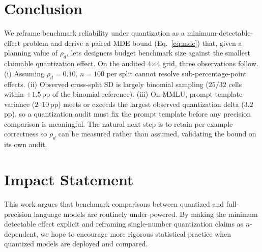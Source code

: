 \documentclass{article}
\begin{document}
\section{Conclusion}

We reframe benchmark reliability under quantization as a minimum-detectable-effect problem and derive a paired MDE bound (Eq.~\ref{eq:mde}) that, given a planning value of $\rho_d$, lets designers budget benchmark size against the smallest claimable quantization effect. On the audited 4$\times$4 grid, three observations follow. (i) Assuming $\rho_d{=}0.10$, $n{=}100$ per split cannot resolve sub-percentage-point effects. (ii) Observed cross-split SD is largely binomial sampling ($25/32$ cells within $\pm 1.5$\,pp of the binomial reference). (iii) On MMLU, prompt-template variance ($2$--$10$\,pp) meets or exceeds the largest observed quantization delta ($3.2$\,pp), so a quantization audit must fix the prompt template before any precision comparison is meaningful. The natural next step is to retain per-example correctness so $\rho_d$ can be measured rather than assumed, validating the bound on its own audit.

\section*{Impact Statement}

This work argues that benchmark comparisons between quantized and full-precision language models are routinely under-powered. By making the minimum detectable effect explicit and reframing single-number quantization claims as $n$-dependent, we hope to encourage more rigorous statistical practice when quantized models are deployed and compared.

\clearpage

\end{document}
